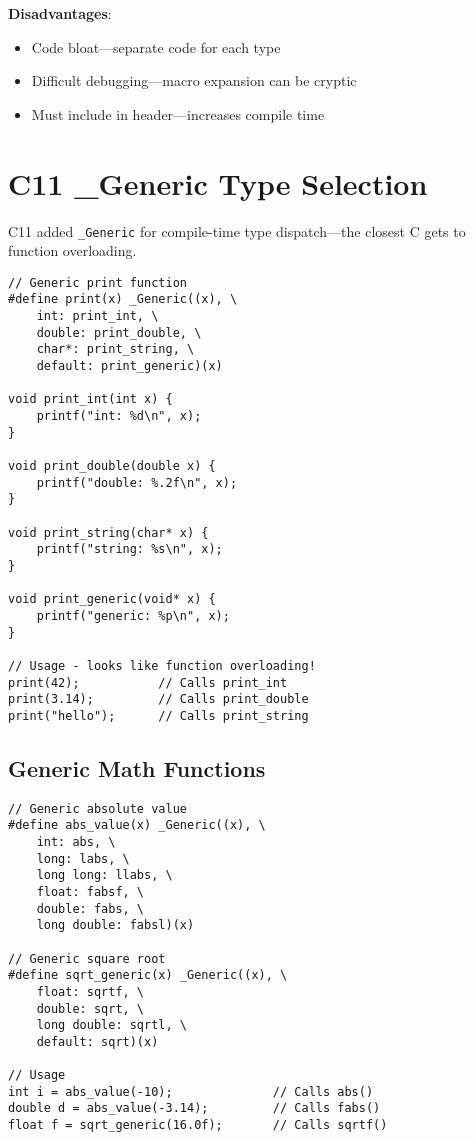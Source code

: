 \textbf{Disadvantages}:
\begin{itemize}
    \item Code bloat—separate code for each type
    \item Difficult debugging—macro expansion can be cryptic
    \item Must include in header—increases compile time
\end{itemize}

\section{C11 \_Generic Type Selection}

C11 added \texttt{\_Generic} for compile-time type dispatch—the closest C gets to function overloading.

\begin{lstlisting}
// Generic print function
#define print(x) _Generic((x), \
    int: print_int, \
    double: print_double, \
    char*: print_string, \
    default: print_generic)(x)

void print_int(int x) {
    printf("int: %d\n", x);
}

void print_double(double x) {
    printf("double: %.2f\n", x);
}

void print_string(char* x) {
    printf("string: %s\n", x);
}

void print_generic(void* x) {
    printf("generic: %p\n", x);
}

// Usage - looks like function overloading!
print(42);           // Calls print_int
print(3.14);         // Calls print_double
print("hello");      // Calls print_string
\end{lstlisting}

\subsection{Generic Math Functions}

\begin{lstlisting}
// Generic absolute value
#define abs_value(x) _Generic((x), \
    int: abs, \
    long: labs, \
    long long: llabs, \
    float: fabsf, \
    double: fabs, \
    long double: fabsl)(x)

// Generic square root
#define sqrt_generic(x) _Generic((x), \
    float: sqrtf, \
    double: sqrt, \
    long double: sqrtl, \
    default: sqrt)(x)

// Usage
int i = abs_value(-10);              // Calls abs()
double d = abs_value(-3.14);         // Calls fabs()
float f = sqrt_generic(16.0f);       // Calls sqrtf()
\end{lstlisting}

